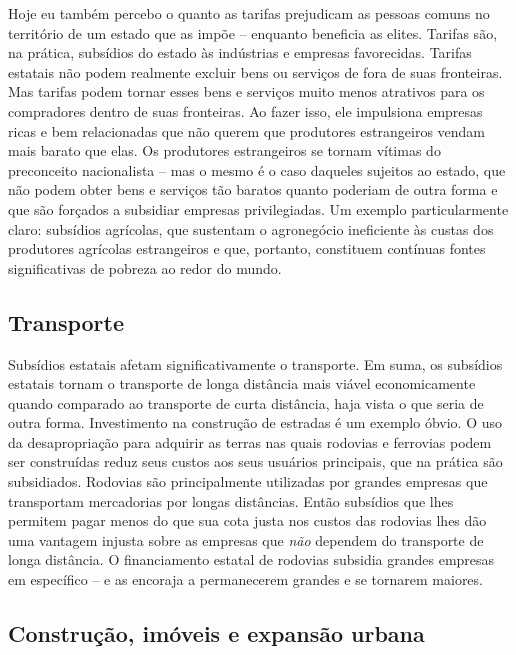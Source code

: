 Hoje eu também percebo o quanto as tarifas prejudicam as pessoas comuns no território de um estado que as impõe -- enquanto beneficia as elites. Tarifas são, na prática, subsídios do estado às indústrias e empresas favorecidas. Tarifas estatais não podem realmente excluir bens ou serviços de fora de suas fronteiras. Mas tarifas podem tornar esses bens e serviços muito menos atrativos para os compradores dentro de suas fronteiras. Ao fazer isso, ele impulsiona empresas ricas e bem relacionadas que não querem que produtores estrangeiros vendam mais barato que elas. Os produtores estrangeiros se tornam vítimas do preconceito nacionalista -- mas o mesmo é o caso daqueles sujeitos ao estado, que não podem obter bens e serviços tão baratos quanto poderiam de outra forma e que são forçados a subsidiar empresas privilegiadas. Um exemplo particularmente claro: subsídios agrícolas, que sustentam o agronegócio ineficiente às custas dos produtores agrícolas estrangeiros e que, portanto, constituem contínuas fontes significativas de pobreza ao redor do mundo.

\subsection*{Transporte}

Subsídios estatais afetam significativamente o transporte. Em suma, os subsídios estatais tornam o transporte de longa distância mais viável economicamente quando comparado ao transporte de curta distância, haja vista o que seria de outra forma. Investimento na construção de estradas é um exemplo óbvio. O uso da desapropriação para adquirir as terras nas quais rodovias e ferrovias podem ser construídas reduz seus custos aos seus usuários principais, que na prática são subsidiados. Rodovias são principalmente utilizadas por grandes empresas que transportam mercadorias por longas distâncias. Então subsídios que lhes permitem pagar menos do que sua cota justa nos custos das rodovias lhes dão uma vantagem injusta sobre as empresas que \emph{não} dependem do transporte de longa distância. O financiamento estatal de rodovias subsidia grandes empresas em específico -- e as encoraja a permanecerem grandes e se tornarem maiores.

\subsection*{Construção, imóveis e expansão urbana}

